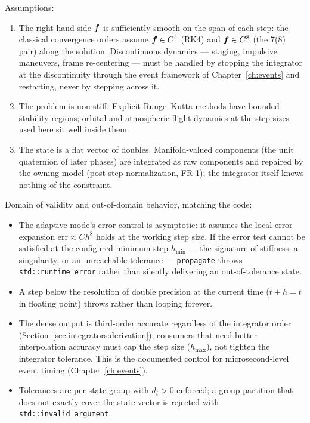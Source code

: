 Assumptions:
\begin{enumerate}
  \item The right-hand side $\bm{f}$ is sufficiently smooth on the span of
    each step: the classical convergence orders assume
    $\bm{f} \in C^{4}$ (RK4) and $\bm{f} \in C^{8}$ (the 7(8) pair) along
    the solution. Discontinuous dynamics --- staging, impulsive maneuvers,
    frame re-centering --- must be handled by stopping the integrator at the
    discontinuity through the event framework of Chapter~\ref{ch:events} and
    restarting, never by stepping across it.
  \item The problem is non-stiff. Explicit Runge--Kutta methods have bounded
    stability regions; orbital and atmospheric-flight dynamics at the step
    sizes used here sit well inside them.
  \item The state is a flat vector of doubles. Manifold-valued components
    (the unit quaternion of later phases) are integrated as raw components
    and repaired by the owning model (post-step normalization, FR-1); the
    integrator itself knows nothing of the constraint.
\end{enumerate}

Domain of validity and out-of-domain behavior, matching the code:
\begin{itemize}
  \item The adaptive mode's error control is asymptotic: it assumes the
    local-error expansion $\text{err} \approx C h^{8}$ holds at the working
    step size. If the error test cannot be satisfied at the configured
    minimum step $h_{\min}$ --- the signature of stiffness, a singularity,
    or an unreachable tolerance --- \texttt{propagate} throws
    \texttt{std::runtime\_error} rather than silently delivering an
    out-of-tolerance state.
  \item A step below the resolution of double precision at the current time
    ($t + h = t$ in floating point) throws rather than looping forever.
  \item The dense output is third-order accurate regardless of the
    integrator order (Section~\ref{sec:integrators:derivation}); consumers
    that need better interpolation accuracy must cap the step size
    ($h_{\max}$), not tighten the integrator tolerance. This is the
    documented control for microsecond-level event timing
    (Chapter~\ref{ch:events}).
  \item Tolerances are per state group with $d_i > 0$ enforced; a group
    partition that does not exactly cover the state vector is rejected with
    \texttt{std::invalid\_argument}.
\end{itemize}

